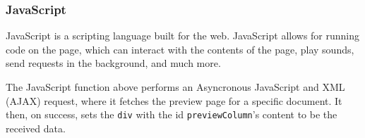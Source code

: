 \documentclass[../../master.tex]{subfiles}
\begin{document}
\subsubsection*{JavaScript}
JavaScript is a scripting language built for the web.
JavaScript allows for running code on the page, which can interact with the contents of the page, play sounds, send requests in the background, and much more.\cite{nixonweb}

The JavaScript function above performs an Asyncronous JavaScript and XML (AJAX) request, where it fetches the preview page for a specific document.
It then, on success, sets the \texttt{div} with the id \texttt{previewColumn}'s content to be the received data.
\end{document}
